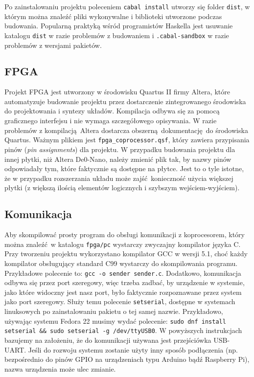 Po zainstalowaniu projektu poleceniem \texttt{cabal install} utworzy się folder \texttt{dist}, w którym można znaleźć pliki wykonywalne i biblioteki utworzone podczas budowania. Popularną praktyką wśród programistów Haskella jest usuwanie katalogu \texttt{dist} w razie problemów z budowaniem i \texttt{.cabal-sandbox} w razie problemów z wersjami pakietów.

\subsection{FPGA}

Projekt FPGA jest utworzony w środowisku Quartus II firmy Altera, które automatyzuje budowanie projektu przez dostarczenie zintegrowanego środowiska do projektowania i syntezy układów. Kompilacja odbywa się za pomocą graficznego interfejsu i nie wymaga szczegółowego opisywania. W razie problemów z kompilacją Altera dostarcza obszerną dokumentację do środowiska Quartus. Ważnym plikiem jest \texttt{fpga\_coprocessor.qsf}, który zawiera przypisania pinów (\textit{pin assignments}) dla projektu. W przypadku budowania projektu dla innej płytki, niż Altera De0-Nano, należy zmienić plik tak, by nazwy pinów odpowiadały tym, które faktycznie są dostępne na płytce. Jest to o tyle istotne, że w przypadku rozszerzania układu może zajść konieczność użycia większej płytki (z większą ilością elementów logicznych i szybszym wejściem-wyjściem).

\subsection{Komunikacja}

Aby skompilować prosty program do obsługi komunikacji z koprocesorem, który można znaleźć w katalogu \texttt{fpga/pc} wystarczy zwyczajny kompilator języka C. Przy tworzeniu projektu wykorzystano kompilator GCC w wersji 5.1, choć każdy kompilator obsługujący standard C99 wystarczy do skompilowania programu. Przykładowe polecenie to: \texttt{gcc -o sender sender.c}. Dodatkowo, komunikacja odbywa się przez port szeregowy, więc trzeba zadbać, by urządzenie w systemie, jako które widoczny jest nasz port, było faktycznie rozpoznawane przez system jako port szeregowy. Służy temu polecenie \texttt{setserial}, dostępne w systemach linuksowych po zainstalowaniu pakietu o tej samej nazwie. Przykładowo, używając systemu Fedora 22 musimy wydać polecenie: \texttt{sudo dnf install setserial \&\& sudo setserial -g /dev/ttyUSB0}. W powyższych instrukcjach bazujemy na założeniu, że do komunikacji używana jest przejściówka USB-UART. Jeśli do rozwoju systemu zostanie użyty inny sposób podłączenia (np. bezpośrednio do pinów GPIO na urządzeniach typu Arduino bądź Raspberry Pi), nazwa urządzenia może ulec zmianie.
